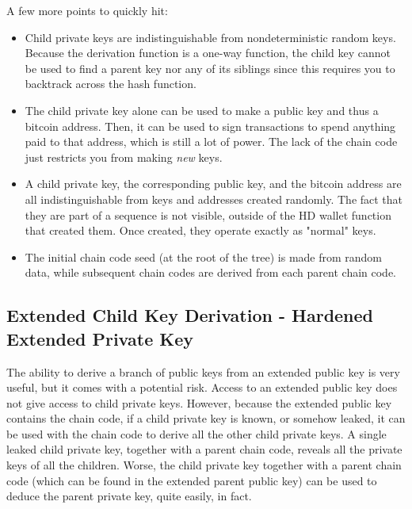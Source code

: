 \documentclass{article}
\begin{document}
    A few more points to quickly hit:
    \begin{itemize}
      \item Child private keys are indistinguishable from nondeterministic random keys. Because the derivation function is a one-way function, the child key cannot be used to find a parent key nor any of its siblings since this requires you to backtrack across the hash function.
      \item The child private key alone can be used to make a public key and thus a bitcoin address. Then, it can be used to sign transactions to spend anything paid to that address, which is still a lot of power. The lack of the chain code just restricts you from making \textit{new} keys.
      \item A child private key, the corresponding public key, and the bitcoin address are all indistinguishable from keys and addresses created randomly. The fact that they are part of a sequence is not visible, outside of the HD wallet function that created them. Once created, they operate exactly as "normal" keys.
      \item The initial chain code seed (at the root of the tree) is made from random data, while subsequent chain codes are derived from each parent chain code.
    \end{itemize}

  \subsection{Extended Child Key Derivation - Hardened Extended Private Key}

    The ability to derive a branch of public keys from an extended public key is very useful, but it comes with a potential risk. Access to an extended public key does not give access to child private keys. However, because the extended public key contains the chain code, if a child private key is known, or somehow leaked, it can be used with the chain code to derive all the other child private keys. A single leaked child private key, together with a parent chain code, reveals all the private keys of all the children. Worse, the child private key together with a parent chain code (which can be found in the extended parent public key) can be used to deduce the parent private key, quite easily, in fact.
\end{document}
